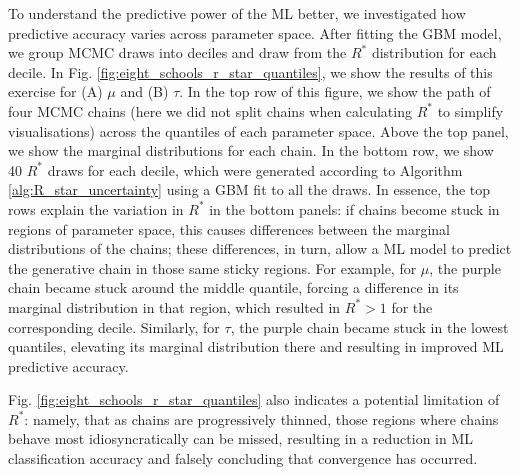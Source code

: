 \documentclass{article}
\begin{document}
To understand the predictive power of the ML better, we investigated how predictive accuracy varies across parameter space. After fitting the GBM model, we group MCMC draws into deciles and draw from the $R^*$ distribution for each decile. In Fig. \ref{fig:eight_schools_r_star_quantiles}, we show the results of this exercise for (A) $\mu$ and (B) $\tau$. In the top row of this figure, we show the path of four MCMC chains (here we did not split chains when calculating $R^*$ to simplify visualisations) across the quantiles of each parameter space. Above the top panel, we show the marginal distributions for each chain. In the bottom row, we show 40 $R^*$ draws for each decile, which were generated according to Algorithm \ref{alg:R_star_uncertainty} using a GBM fit to all the draws. In essence, the top rows explain the variation in $R^*$ in the bottom panels: if chains become stuck in regions of parameter space, this causes differences between the marginal distributions of the chains; these differences, in turn, allow a ML model to predict the generative chain in those same sticky regions. For example, for $\mu$, the purple chain became stuck around the middle quantile, forcing a difference in its marginal distribution in that region, which resulted in $R^*>1$ for the corresponding decile. Similarly, for $\tau$, the purple chain became stuck in the lowest quantiles, elevating its marginal distribution there and resulting in improved ML predictive accuracy.

Fig. \ref{fig:eight_schools_r_star_quantiles} also indicates a potential limitation of $R^*$: namely, that as chains are progressively thinned, those regions where chains behave most idiosyncratically can be missed, resulting in a reduction in ML classification accuracy and falsely concluding that convergence has occurred.
\end{document}
